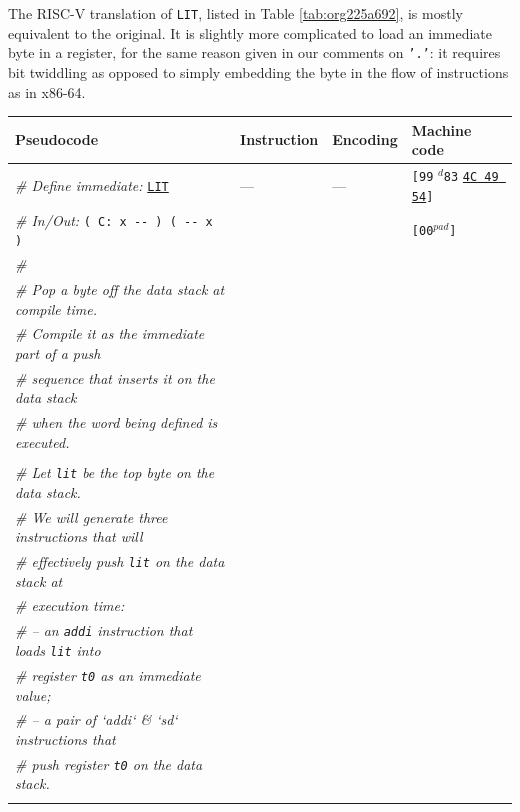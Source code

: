 \documentclass[a4paper,12pt,final]{article}
\begin{document}
The RISC-V translation of \texttt{LIT}, listed in Table \ref{tab:org225a692}, is
mostly equivalent to the original.  It is slightly more complicated to
load an immediate byte in a register, for the same reason given in our
comments on \texttt{'.'}: it requires bit twiddling as opposed to simply
embedding the byte in the flow of instructions as in x86-64.

\begin{table}[!htbp] \begin{adjustwidth}{-1cm}{-1cm} \fontsize{8}{9.600000}\selectfont
\begin{center}
\begin{tabular}{l|ll|l}
\textbf{Pseudocode} & \textbf{Instruction} & \textbf{Encoding} & \textbf{Machine code}\\[0pt]
\hline
\emph{\# Define immediate:} \uline{\texttt{LIT}} & --- & --- & \texttt{[99} \(^{d}\)​\texttt{83} \uline{\texttt{4C 49 54}}​\texttt{]}\\[0pt]
\emph{\# In/Out:} \texttt{( C: x -​- ) ( -{}-{} x )} &  &  & \texttt{[00}​\(^{pad}\)​\texttt{]}\\[0pt]
\emph{\#} &  &  & \\[0pt]
\emph{\# Pop a byte off the data stack at compile time.} &  &  & \\[0pt]
\emph{\# Compile it as the immediate part of a push} &  &  & \\[0pt]
\emph{\# sequence that inserts it on the data stack} &  &  & \\[0pt]
\emph{\# when the word being defined is executed.} &  &  & \\[0pt]
 &  &  & \\[0pt]
\emph{\# Let \texttt{lit} be the top byte on the data stack.} &  &  & \\[0pt]
\emph{\# We will generate three instructions that will} &  &  & \\[0pt]
\emph{\# effectively push \texttt{lit} on the data stack at} &  &  & \\[0pt]
\emph{\# execution time:} &  &  & \\[0pt]
\emph{\# – an \texttt{addi} instruction that loads \texttt{lit} into} &  &  & \\[0pt]
\emph{\# register \texttt{t0} as an immediate value;} &  &  & \\[0pt]
\emph{\# – a pair of `addi` \& `sd` instructions that} &  &  & \\[0pt]
\emph{\# push register \texttt{t0} on the data stack.} &  &  & \\[0pt]
 &  &  & \\[0pt]

\end{tabular}
\end{center}
\end{adjustwidth}
\end{table}
\end{document}
